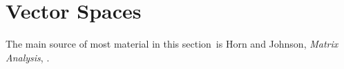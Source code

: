 


\renewcommand\sectype{section}

\section{Vector Spaces}
The main source of most material in this \sectype\ is Horn and Johnson,
{\it Matrix Analysis}, \cite{HornJohnson:1985}. 

